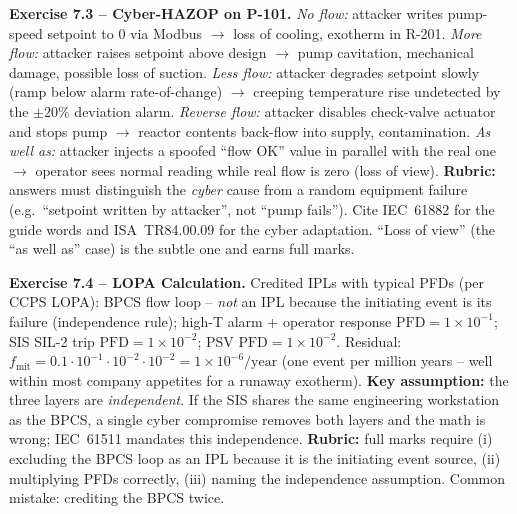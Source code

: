 \documentclass[11pt,a4paper]{article}
\begin{document}
\begin{solutionbox}
\textbf{Exercise 7.3 -- Cyber-HAZOP on P-101.}
\emph{No flow:} attacker writes pump-speed setpoint to 0 via Modbus
$\to$ loss of cooling, exotherm in R-201.
\emph{More flow:} attacker raises setpoint above design $\to$ pump
cavitation, mechanical damage, possible loss of suction.
\emph{Less flow:} attacker degrades setpoint slowly (ramp below alarm
rate-of-change) $\to$ creeping temperature rise undetected by the
$\pm 20\%$ deviation alarm.
\emph{Reverse flow:} attacker disables check-valve actuator and stops
pump $\to$ reactor contents back-flow into supply, contamination.
\emph{As well as:} attacker injects a spoofed ``flow OK'' value in
parallel with the real one $\to$ operator sees normal reading while
real flow is zero (loss of view).
\textbf{Rubric:} answers must distinguish the \emph{cyber} cause from a
random equipment failure (e.g.\ ``setpoint written by attacker'', not
``pump fails''). Cite IEC~61882 for the guide words and
ISA~TR84.00.09 for the cyber adaptation. ``Loss of view'' (the
``as well as'' case) is the subtle one and earns full marks.
\end{solutionbox}

\begin{solutionbox}
\textbf{Exercise 7.4 -- LOPA Calculation.}
Credited IPLs with typical PFDs (per CCPS LOPA):
BPCS flow loop -- \emph{not} an IPL because the initiating event is its
failure (independence rule); high-T alarm + operator response
$\text{PFD}=1\times 10^{-1}$; SIS SIL-2 trip $\text{PFD}=1\times 10^{-2}$;
PSV $\text{PFD}=1\times 10^{-2}$. Residual:
$f_\text{mit} = 0.1 \cdot 10^{-1} \cdot 10^{-2} \cdot 10^{-2}
              = 1\times 10^{-6}/\text{year}$
(one event per million years -- well within most company appetites for a
runaway exotherm).
\textbf{Key assumption:} the three layers are \emph{independent}. If the
SIS shares the same engineering workstation as the BPCS, a single cyber
compromise removes both layers and the math is wrong; IEC~61511 mandates
this independence.
\textbf{Rubric:} full marks require (i) excluding the BPCS loop as an
IPL because it is the initiating event source, (ii) multiplying PFDs
correctly, (iii) naming the independence assumption. Common mistake:
crediting the BPCS twice.
\end{solutionbox}
\end{document}
